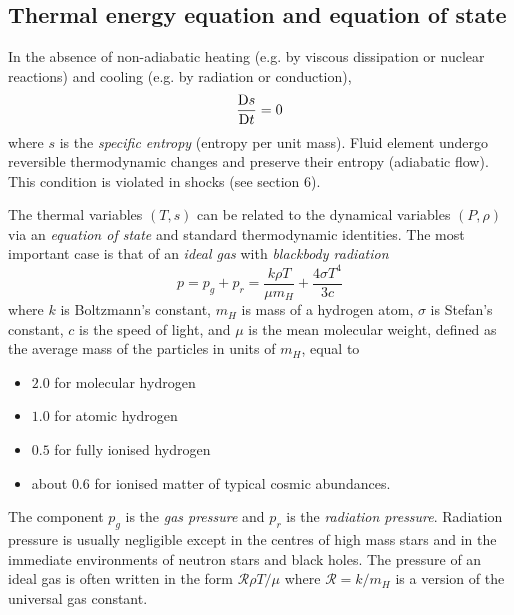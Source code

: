 \documentclass{jknotes}
\begin{document}
\subsection{Thermal energy equation and equation of state}
In the absence of non-adiabatic heating (e.g. by viscous dissipation or
nuclear reactions) and cooling (e.g. by radiation or conduction),
\begin{equation}
	\frac{\mathrm{D} s}{\mathrm{D} t} = 0
\end{equation}
where $s$ is the \emph{specific entropy} (entropy per unit mass). Fluid
element undergo reversible thermodynamic changes and preserve their entropy
(adiabatic flow). This condition is violated in shocks (see section 6).

The thermal variables $(T,s)$ can be related to the dynamical variables
$(P,\rho)$ via an \emph{equation of state} and standard thermodynamic
identities. The most important case is that of an \emph{ideal gas} with
\emph{blackbody radiation}
\begin{equation}
	p = p_g + p_r = \frac{k \rho T}{\mu m_H} + \frac{4\sigma T^4}{3c}
\end{equation}
where $k$ is Boltzmann's constant, $m_H$ is mass of a hydrogen atom, $\sigma$
is Stefan's constant, $c$ is the speed of light, and $\mu$ is the mean
molecular weight, defined as the average mass of the particles in units of
$m_H$, equal to
\begin{itemize}
	\item $2.0$ for molecular hydrogen
	\item $1.0$ for atomic hydrogen
	\item $0.5$ for fully ionised hydrogen
	\item about $0.6$ for ionised matter of typical cosmic abundances.
\end{itemize}
The component $p_g$ is the \emph{gas pressure} and $p_r$ is the
\emph{radiation pressure}. Radiation pressure is usually negligible except in
the centres of high mass stars and in the immediate environments of neutron
stars and black holes. The pressure of an ideal gas is often written in the
form $\mathcal{R}\rho T/\mu$ where $\mathcal{R} = k/m_H$ is a version of the
universal gas constant.
\end{document}
